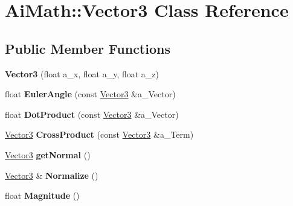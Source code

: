 \hypertarget{class_ai_math_1_1_vector3}{\section{Ai\+Math\+:\+:Vector3 Class Reference}
\label{class_ai_math_1_1_vector3}
}
\subsection*{Public Member Functions}
\begin{DoxyCompactItemize}
\item 
\hypertarget{class_ai_math_1_1_vector3_ae6f2abe7d986ad54e7eefdf6dabec507}{{\bfseries Vector3} (float a\+\_\+x, float a\+\_\+y, float a\+\_\+z)}\label{class_ai_math_1_1_vector3_ae6f2abe7d986ad54e7eefdf6dabec507}

\item 
\hypertarget{class_ai_math_1_1_vector3_a226a8807e38a2cdd1a1c3d0ed4925c30}{float {\bfseries Euler\+Angle} (const \hyperlink{class_ai_math_1_1_vector3}{Vector3} \&a\+\_\+\+Vector)}\label{class_ai_math_1_1_vector3_a226a8807e38a2cdd1a1c3d0ed4925c30}

\item 
\hypertarget{class_ai_math_1_1_vector3_a7df9de7c1a91a69c58dcb2f2f23bfd18}{float {\bfseries Dot\+Product} (const \hyperlink{class_ai_math_1_1_vector3}{Vector3} \&a\+\_\+\+Vector)}\label{class_ai_math_1_1_vector3_a7df9de7c1a91a69c58dcb2f2f23bfd18}

\item 
\hypertarget{class_ai_math_1_1_vector3_a59a6622712fffc2134c27ce0e4eee24e}{\hyperlink{class_ai_math_1_1_vector3}{Vector3} {\bfseries Cross\+Product} (const \hyperlink{class_ai_math_1_1_vector3}{Vector3} \&a\+\_\+\+Term)}\label{class_ai_math_1_1_vector3_a59a6622712fffc2134c27ce0e4eee24e}

\item 
\hypertarget{class_ai_math_1_1_vector3_a7dedb0403be83ffd9dff60211b49c23d}{\hyperlink{class_ai_math_1_1_vector3}{Vector3} {\bfseries get\+Normal} ()}\label{class_ai_math_1_1_vector3_a7dedb0403be83ffd9dff60211b49c23d}

\item 
\hypertarget{class_ai_math_1_1_vector3_a9f69da4757618f1e5bd98da1313da62b}{\hyperlink{class_ai_math_1_1_vector3}{Vector3} \& {\bfseries Normalize} ()}\label{class_ai_math_1_1_vector3_a9f69da4757618f1e5bd98da1313da62b}

\item 
\hypertarget{class_ai_math_1_1_vector3_adf948ff9a311e1380ee7e8eb8e1f4e4e}{float {\bfseries Magnitude} ()}\label{class_ai_math_1_1_vector3_adf948ff9a311e1380ee7e8eb8e1f4e4e}


\end{DoxyCompactItemize}

